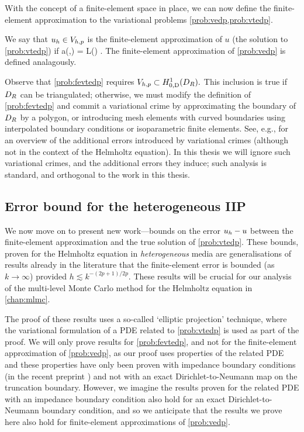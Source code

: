     With the concept of a finite-element space in place, we can now define the finite-element approximation to the variational problems \cref{prob:vedp,prob:vtedp}.

    \label{prob:fevtedp}
We say that $u_{h} \in V_{h,p}$ is the finite-element approximation of $u$ (the solution to \cref{prob:vtedp}) if
    \beqs
    a(\uh,\vh) = L(\vh) \tforall \vh \in \Vhp.
    \eeqs
    The finite-element approximation of \cref{prob:vedp} is defined analagously.
    \eprob

    Observe that \cref{prob:fevtedp} requires $\Vhp \subset \HozDDR.$ This inclusion is true if $D_{R}$ can be triangulated; otherwise, we must modify the definition of \cref{prob:fevtedp} and commit a variational crime by approximating the boundary of $D_{R}$ by a polygon, or introducing mesh elements with curved boundaries using interpolated boundary conditions or isoparametric finite elements. See, e.g., \cite[Chapter 10]{BrSc:08} for an overview of the additional errors introduced by variational crimes (although not in the context of the Helmholtz equation). In this thesis we will ignore such variational crimes, and the additional errors they induce; such analysis is standard, and orthogonal to the work in this thesis.
    \ere
    

    \subsection{Error bound for the heterogeneous IIP}\label{sec:errbound}

    We now move on to present new work---bounds on the error $u_{h}-u$ between the finite-element approximation and the true solution of \cref{prob:vtedp}. These bounds, proven for the Helmholtz equation in \emph{heterogeneous} media are generalisations of results already in the literature that the finite-element error is bounded (as $k\rightarrow \infty$) provided $h \lesssim k^{-(2p+1)/2p}$. These results will be crucial for our analysis of the multi-level Monte Carlo method for the Helmholtz equation in \cref{chap:mlmc}.

The proof of these results uses a so-called `elliptic projection' technique, where the variational formulation of a PDE related to \cref{prob:vtedp} is used as part of the proof. We will only prove results for \cref{prob:fevtedp}, and not for the finite-element approximation of \cref{prob:vedp}, as our proof uses properties of the related PDE and these properties have only been proven with impedance boundary conditions (in the recent preprint \cite{ChNiTo:18}) and not with an exact Dirichlet-to-Neumann map on the truncation boundary. However, we imagine the results proven for the related PDE with an impedance boundary condition also hold for an exact Dirichlet-to-Neumann boundary condition, and so we anticipate that the results we prove here also hold for finite-element approximations of \cref{prob:vedp}.

